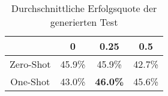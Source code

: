 \bgroup
\def\arraystretch{2}
\begin{table}[H]
	\vspace{.5cm}
	\centering		
	\begin{center}
		\begin{tabular}{|c||c|c|c|}
			\hline 
			& 0 & 0.25 & 0.5 \\
			\hline 
			\hline
			Zero-Shot & 45.9\% & 45.9\% & 42.7\% \\
			\hline
			One-Shot & 43.0\% & \textbf{46.0\%} & 45.6\% \\
			\hline
		\end{tabular} 
	\end{center}
	\caption{Durchschnittliche Erfolgsquote der generierten Test}
	\label{fig:succ}
	\vspace{-.8cm}
\end{table}
\egroup